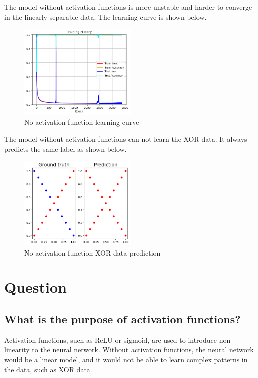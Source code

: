 \documentclass{homework}
\begin{document}
The model without activation functions is more unstable and harder to converge in the linearly separable data. The learning curve is shown below.

\begin{figure}[H]
    \centering
    \includegraphics[width=0.5\textwidth]{linear_no_activation_curve.png}
    \caption{No activation function learning curve}
\end{figure}

The model without activation functions can not learn the XOR data. It always predicts the same label as shown below.

\begin{figure}[H]
    \centering
    \includegraphics[width=0.5\textwidth]{xor_no_activation.png}
    \caption{No activation function XOR data prediction}
\end{figure}

\section{Question}

\subsection{What is the purpose of activation functions?}

Activation functions, such as ReLU or sigmoid, are used to introduce non-linearity to the neural network. Without activation functions, the neural network would be a linear model, and it would not be able to learn complex patterns in the data, such as XOR data.
\end{document}

